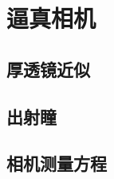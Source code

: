\section{逼真相机}\label{sec:逼真相机}

\subsection{厚透镜近似}\label{sub:厚透镜近似}
\subsection{出射瞳}\label{sub:出射瞳}
\subsection{相机测量方程}\label{sub:相机测量方程}